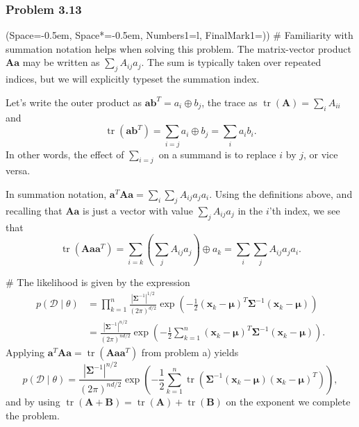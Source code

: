 \documentclass[12pt, a4paper]{article}
\newcommand{\listSpace}{-0.5em}%
\newcommand{\D}{\mathcal{D}}
\newcommand{\vect}[1]{\bm{#1}}
\newcommand{\abs}[1]{\left\lvert#1\right\rvert}
\begin{document}
\subsubsection*{Problem 3.13}
\begin{easylist}[enumerate]
\ListProperties(Space=\listSpace, Space*=\listSpace, Numbers1=l, FinalMark1={)})
# Familiarity with summation notation helps when solving this problem.
The matrix-vector product $\vect{A}\vect{a}$ may be written as $\sum_j A_{ij} a_j$.
The sum is typically taken over repeated indices, but we will explicitly typeset the summation index.

Let's write the outer product as $\vect{a}\vect{b}^T = a_i \oplus b_j$, the trace as $\operatorname{tr}(\vect{A}) = \sum_i A_{ii}$ and
\begin{equation*}
	\operatorname{tr}(\vect{a}\vect{b}^T) = \sum_{i = j} a_i \oplus b_j = \sum_{i} a_i b_i.
\end{equation*}
In other words, the effect of $\sum_{i = j}$ on a summand is to replace $i$ by $j$, or vice versa.

In summation notation, $\vect{a}^T \vect{A} \vect{a} = \sum_i \sum_j A_{ij} a_j a_i$.
Using the definitions above, and recalling that $\vect{A} \vect{a}$ is just a vector with value $\sum_j A_{ij} a_j$ in the $i$'th index, we see that
\begin{equation*}
	\operatorname{tr}( \vect{A} \vect{a} \vect{a}^T) = \sum_{i=k}  \left( \sum_j A_{ij} a_j \right) \oplus a_k = \sum_i \sum_j A_{ij} a_j a_i.
\end{equation*}

# The likelihood is given by the expression
\begin{align*}
	p(\D  \mid  \theta) &= \prod_{k=1}^{n} \frac{\abs{\vect{\Sigma}^{-1}}^{1/2}}{\left(2 \pi \right)^{d/2}} \exp \left( -\frac{1}{2} \left( \vect{x}_k - \vect{\mu} \right)^T  \vect{\Sigma}^{-1}  \left( \vect{x}_k - \vect{\mu} \right)\right) \\
	&=  \frac{\abs{\vect{\Sigma}^{-1}}^{n/2}}{\left(2 \pi \right)^{nd/2}} \exp \left( -\frac{1}{2}  \sum_{k=1}^{n} \left( \vect{x}_k - \vect{\mu} \right)^T  \vect{\Sigma}^{-1}  \left( \vect{x}_k - \vect{\mu} \right)\right).
\end{align*}
Applying $ \vect{a}^T \vect{A} \vect{a} = \operatorname{tr}( \vect{A} \vect{a} \vect{a}^T)$ from problem a) yields
\begin{equation*}
p(\D  \mid  \theta) = \frac{\abs{\vect{\Sigma}^{-1}}^{n/2}}{\left(2 \pi \right)^{nd/2}} \exp \left( -\frac{1}{2}  \sum_{k=1}^{n} 
\operatorname{tr} \left( \vect{\Sigma}^{-1} \left( \vect{x}_k - \vect{\mu} \right) \left( \vect{x}_k - \vect{\mu} \right)^T \right)
\right),
\end{equation*}
and by using $\operatorname{tr}\left(\vect{A} + \vect{B}\right) = \operatorname{tr}\left(\vect{A}\right) + \operatorname{tr}\left( \vect{B}\right)$ on the exponent we complete the problem.


\end{easylist}
\end{document}
